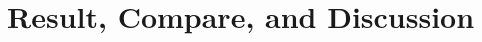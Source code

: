 \documentclass[12pt]{article}
\begin{document}

















\section{Result, Compare, and Discussion}






\end{document}
